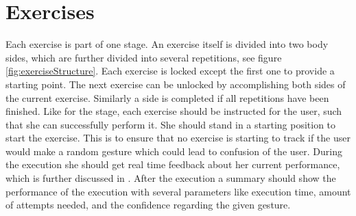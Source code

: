 \section{Exercises}\label{4_5_exercises}
Each exercise is part of one stage. An exercise itself is divided into two body sides, which are further divided into several repetitions, see figure \ref{fig:exerciseStructure}. Each exercise is locked except the first one to provide a starting point. The next exercise can be unlocked by accomplishing both sides of the current exercise. Similarly a side is completed if all repetitions have been finished. Like for the stage, each exercise should be instructed for the user, such that she can successfully perform it. She should stand in a starting position to start the exercise. This is to ensure that no exercise is starting to track if the user would make a random gesture which could lead to confusion of the user. During the execution she should get real time feedback about her current performance, which is further discussed in \textbf{}. After the execution a summary should show the performance of the execution with several parameters like execution time, amount of attempts needed, and the confidence regarding the given gesture.

